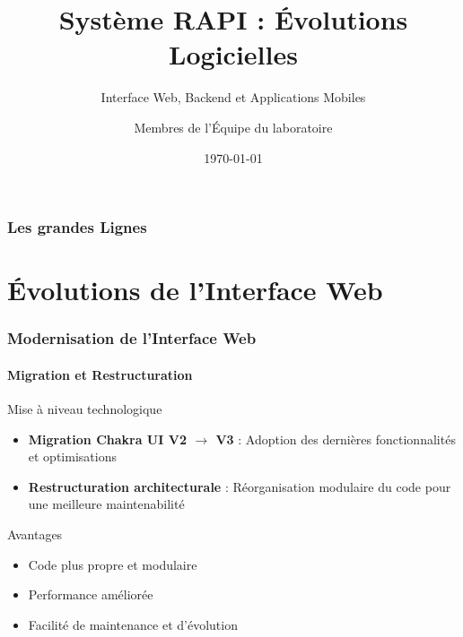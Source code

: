 \documentclass[
	11pt,
	aspectratio=169,
]{beamer}
\title[ALPR - Modifications]{Système RAPI : Évolutions Logicielles}
\subtitle{Interface Web, Backend et Applications Mobiles}
\author[Équipe IA]{Membres de l'Équipe du laboratoire}
\institute[UATM]{
	UATM GASA FORMATION\\
	\smallskip
	\textit{info@uatm-gasa.com}
}
\date[\today]{\today}
\begin{document}

\begin{frame}
	\titlepage
\end{frame}


\begin{frame}
	\frametitle{Les grandes Lignes}
	\tableofcontents
\end{frame}


\section{Évolutions de l'Interface Web}

\begin{frame}
	\frametitle{Modernisation de l'Interface Web}
	\framesubtitle{Migration et Restructuration}
	
	\begin{block}{Mise à niveau technologique}
		\begin{itemize}
			\item \textbf{Migration Chakra UI V2 $\rightarrow$ V3} : Adoption des dernières fonctionnalités et optimisations
			\item \textbf{Restructuration architecturale} : Réorganisation modulaire du code pour une meilleure maintenabilité
		\end{itemize}
	\end{block}
	
	\bigskip
	
	\begin{exampleblock}{Avantages}
		\begin{itemize}
			\item Code plus propre et modulaire
			\item Performance améliorée
			\item Facilité de maintenance et d'évolution
		\end{itemize}
	\end{exampleblock}
\end{frame}
\end{document}
